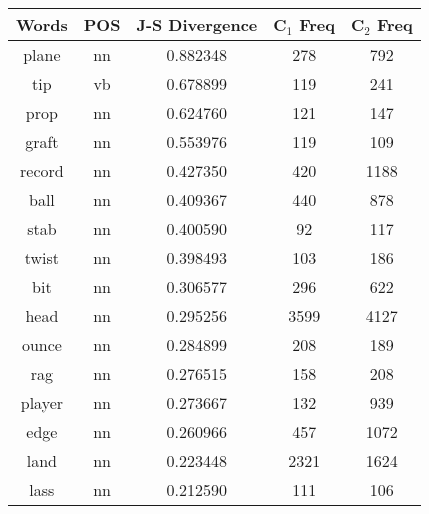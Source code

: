 \begin{table}
\centering
\begin{tabular}{ccccc} 
\toprule
\textbf{ Words } & \textbf{POS } & \textbf{ J-S Divergence } & \textbf{ C$_1$ Freq } & \textbf{ C$_2$ Freq  }  \\ 
\midrule
plane            & nn            & 0.882348                 & 278                & 792                 \\
tip              & vb            & 0.678899                 & 119                & 241                 \\
prop             & nn            & 0.624760                 & 121                & 147                 \\
graft            & nn            & 0.553976                 & 119                & 109                 \\
record           & nn            & 0.427350                 & 420                & 1188                \\
ball             & nn            & 0.409367                 & 440                & 878                 \\
stab             & nn            & 0.400590                 & 92                 & 117                 \\
twist            & nn            & 0.398493                 & 103                & 186                 \\
bit              & nn            & 0.306577                 & 296                & 622                 \\
head             & nn            & 0.295256                 & 3599               & 4127                \\
ounce            & nn            & 0.284899                 & 208                & 189                 \\
rag              & nn            & 0.276515                 & 158                & 208                 \\
player           & nn            & 0.273667                 & 132                & 939                 \\
edge             & nn            & 0.260966                 & 457                & 1072                \\
land             & nn            & 0.223448                 & 2321               & 1624                \\
lass             & nn            & 0.212590                 & 111                & 106                 \\

\end{tabular}
\end{table}
